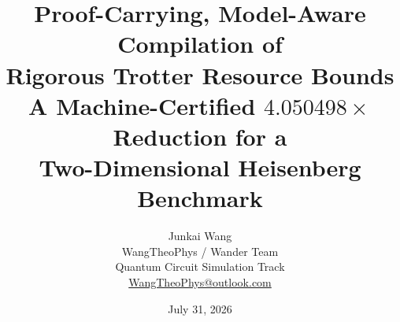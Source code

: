 \documentclass[11pt]{article}
\title{\textbf{Proof-Carrying, Model-Aware Compilation of\\
Rigorous Trotter Resource Bounds}\\[0.4em]
\large A Machine-Certified $4.050498\times$ Reduction for a\\
Two-Dimensional Heisenberg Benchmark}
\author{Junkai Wang\\
\small WangTheoPhys / Wander Team\\
\small Quantum Circuit Simulation Track\\
\small \href{mailto:WangTheoPhys@outlook.com}{WangTheoPhys@outlook.com}}
\date{July 31, 2026}
\theoremstyle{definition}
\begin{document}
\maketitle

\tableofcontents
\clearpage
















\appendix


{\small


}
\end{document}
